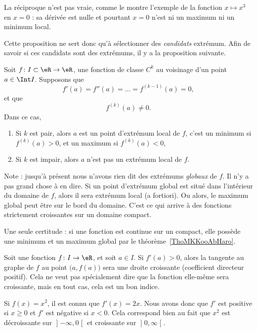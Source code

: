 La réciproque n'est pas vraie, comme le montre l'exemple de la fonction \( x\mapsto x^3\) en \( x=0\) : sa dérivée est nulle et pourtant \( x=0\) n'est ni un maximum ni un minimum local.

Cette proposition ne sert donc qu'à sélectionner des \emph{candidats} extrémum. Afin de savoir si ces candidats sont des extrémums, il y a la proposition suivante.
\begin{proposition}
    Soit \( f\colon I\subset \eR\to \eR\), une fonction de classe \( C^k\) au voisinage d'un point \( a\in\Int I\). Supposons que
    \begin{equation}
        f'(a)=f''(a)=\ldots=f^{(k-1)}(a)=0,
    \end{equation}
    et que
    \begin{equation}
        f^{(k)}(a)\neq 0.
    \end{equation}
    Dans ce cas,
    \begin{enumerate}
        \item
            Si \( k\) est pair, alors \( a\) est un point d'extrémum local de \( f\), c'est un minimum si \( f^{(k)}(a)>0\), et un maximum si \( f^{(k)}(a)<0\),
        \item
            Si \( k\) est impair, alors \( a\) n'est pas un extrémum local de \( f\).
    \end{enumerate}
\end{proposition}

Note : jusqu'à présent nous n'avons rien dit des extrémums \emph{globaux} de \( f\). Il n'y a pas grand chose à en dire. Si un point d'extrémum global est situé dans l'intérieur du domaine de \( f\), alors il sera extrémum local (a fortiori). Ou alors, le maximum global peut être sur le bord du domaine. C'est ce qui arrive à des fonctions strictement croissantes sur un domaine compact.

Une seule certitude : si une fonction est continue sur un compact, elle possède une minimum et un maximum global par le théorème~\ref{ThoMKKooAbHaro}.

Soit une fonction \( f\colon I\to \eR\), et soit \( a\in I\). Si \( f'(a)>0\), alors la tangente au graphe de \( f\) au point \( \big( a,f(a) \big)\) sera une droite croissante (coefficient directeur positif). Cela ne veut pas spécialement dire que la fonction elle-même sera croissante, mais en tout cas, cela est un bon indice.

\begin{example}
    Si \( f(x)=x^2\), il est connu que \( f'(x)=2x\). Nous avons donc que \( f'\) est positive si \( x\geq 0\) et \( f'\) est négative si \( x<0\). Cela correspond bien au fait que \( x^2\) est décroissante sur \( \mathopen] -\infty , 0 \mathclose[\) et croissante sur \( \mathopen] 0 , \infty \mathclose[\).
\end{example}

